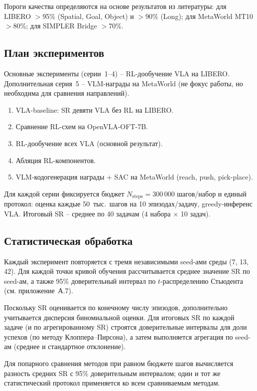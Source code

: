     Пороги качества определяются на основе результатов из литературы: для LIBERO $>$95\% (Spatial, Goal, Object) и $>$90\% (Long); для MetaWorld MT10 $>$80\%; для SIMPLER Bridge $>$70\%.

\subsection{План экспериментов}
\label{subsec:plan}

    Основные эксперименты (серии~1--4) -- RL-дообучение VLA на LIBERO. Дополнительная серия~5 -- VLM-награды на MetaWorld (не фокус работы, но необходима для сравнения направлений).

\begin{enumerate}
    \item VLA-baseline: SR девяти VLA без RL на LIBERO.
    \item Сравнение RL-схем на OpenVLA-OFT-7B.
    \item RL-дообучение всех VLA (основной результат).
    \item Абляция RL-компонентов.
    \item[\textit{доп.}] VLM-кодогенерация награды + SAC на MetaWorld (reach, push, pick-place).
\end{enumerate}

    Для каждой серии фиксируется бюджет $N_{\text{steps}} = 300\,000$ шагов/набор и единый протокол: оценка каждые 50~тыс.\ шагов на 10 эпизодах/задачу, greedy-инференс VLA. Итоговый SR -- среднее по 40 задачам (4 набора $\times$ 10 задач).

\subsection{Статистическая обработка}
\label{subsec:stats}

    Каждый эксперимент повторяется с тремя независимыми seed-ами среды (7, 13, 42). Для каждой точки кривой обучения рассчитывается среднее значение SR по seed-ам, а также 95\% доверительный интервал по $t$-распределению Стьюдента (см. приложение~А.7).

    Поскольку SR оценивается по конечному числу эпизодов, дополнительно учитывается дисперсия биномиальной оценки. Для итоговых SR по каждой задаче (и по агрегированному SR) строятся доверительные интервалы для доли успехов (по методу Клоппера--Пирсона), а затем выполняется агрегация по seed-ам (среднее и стандартное отклонение).

    Для попарного сравнения методов при равном бюджете шагов вычисляется разность средних SR с 95\% доверительным интервалом; один и тот же статистический протокол применяется ко всем сравниваемым методам.

